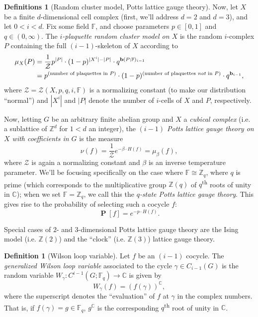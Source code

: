 \documentclass[11pt]{article}
\theoremstyle{definition}
\newtheorem*{definition*}{Definition}
\newtheorem*{definitions*}{Definitions}
\newcommand{\Z}{\mathbb{Z}}			%
\newcommand{\C}{\mathbb{C}}			%
\newcommand{\F}{\mathbb{F}}			%
\newcommand{\probability}[1]{\operatorname{\mathbf P}\left[#1\right]}	%
\newcommand{\betti}{\mathbf{b}}									%
\begin{document}
 		\begin{definitions*}[Random cluster model, Potts lattice gauge theory]
 			Now, let $X$ be a finite $d$-dimensional cell complex (first, we'll address $d=2$ and $d=3$), and let $0 < i < d$. Fix some field $\F$, and choose parameters $p \in [0,1]$ and $q \in (0, \infty)$. The \textit{$i$-plaquette random cluster model on $X$} is the random $i$-complex $P$ containing the full $(i-1)$-skeleton of $X$ according to 
	 		\begin{align*}
	 			\mu_X(P) &= \frac{1}{\mathcal Z} p^{|P|} \cdot (1-p)^{|X^i| - |P|} \cdot q^{\betti(P; \F)_{i-1}} \\
	 			&= p^{(\text{number of plaquettes in } P)} \cdot (1-p)^{(\text{number of plaquettes \textit{not} in }P)} \cdot q^{\betti_{i-1}},
	 		\end{align*}
	 		where $\mathcal Z = \mathcal Z(X,p,q,i,\F)$ is a normalizing constant (to make our distribution ``normal'') and $|X^i|$ and $|P|$ denote the number of $i$-cells of $X$ and $P$, respectively.
	 		
	 		Now, letting $G$ be an arbitrary finite abelian group and $X$ a \textit{cubical complex} (i.e. a sublattice of $\Z^d$ for $1 < d$ an integer), the \textit{$(i-1)$ Potts lattice gauge theory on $X$ with coefficients in $G$} is the measure $$\nu(f) = \frac{1}{\mathcal Z} e^{-\beta \cdot H(f)} = \mu_\beta(f) ,$$ where $\mathcal Z$ is again a normalizing constant and $\beta$ is an inverse temperature parameter. We'll be focusing specifically on the case where $\F \cong \Z_q$, where $q$ is prime (which corresponds to the multiplicative group $\Z(q)$ of $q$\textsuperscript{th} roots of unity in $\C$); when we set $\F = \Z_q$, we call this the \textit{$q$-state Potts lattice gauge theory}. This gives rise to the probability of selecting such a cocycle $f$: $$ \probability{f} = e^{-p \cdot H(f)}. $$
 		\end{definitions*}
 		
 		Special cases of $2$- and $3$-dimensional Potts lattice gauge theory are the Ising model (i.e. $\Z(2)$) and the ``clock'' (i.e. $\Z(3)$) lattice gauge theory.
 		
 		\begin{definition*}[Wilson loop variable]
 			Let $f$ be an $(i-1)$ cocycle. The \textit{generalized Wilson loop variable} associated to the cycle $\gamma \in C_{i-1}(G)$ is the random variable $W_\gamma: C^{i-1}(G; \F_q) \to \C$ is given by $$W_\gamma(f) = (f(\gamma))^\C,$$ where the superscript denotes the ``evaluation'' of $f$ at $\gamma$ in the complex numbers. That is, if $f(\gamma) = g \in \F_q$, $g^\C$ is the corresponding $q$\textsuperscript{th} root of unity in $\C$.
 		\end{definition*}
 		
\end{document}
